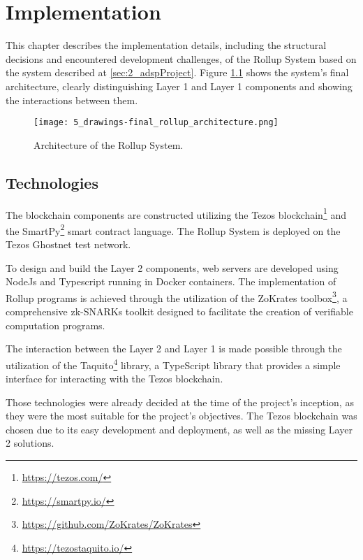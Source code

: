 \chapter{Implementation \label{cha:chapter6}}

This chapter describes the implementation details, including the structural decisions and  encountered development challenges, of the Rollup System based on the system described at \ref{sec:2_adspProject}. Figure \ref{fig:6_drawings-final_rollup_architecture} shows the system's final architecture, clearly distinguishing Layer 1 and Layer 1 components and showing the interactions between them.

\begin{figure}[ht]
	\centering
	\texttt{[image: 5\_drawings-final\_rollup\_architecture.png]}
	\caption[Rollup Architecture]{Architecture of the Rollup System.}
	\label{fig:6_drawings-final_rollup_architecture}
\end{figure}

\section{Technologies\label{sec:technologies}}

The blockchain components are constructed utilizing the Tezos blockchain\footnote{\url{https://tezos.com/}} and the SmartPy\footnote{\url{https://smartpy.io/}} smart contract language. The Rollup System is deployed on the Tezos Ghostnet test network.

To design and build the Layer 2 components, web servers are developed using NodeJs and Typescript running in Docker containers. The implementation of Rollup programs is achieved through the utilization of the ZoKrates toolbox\footnote{\url{https://github.com/ZoKrates/ZoKrates}}, a comprehensive zk-SNARKs toolkit designed to facilitate the creation of verifiable computation programs.

The interaction between the Layer 2 and Layer 1 is made possible through the utilization of the Taquito\footnote{\url{https://tezostaquito.io/}} library, a TypeScript library that provides a simple interface for interacting with the Tezos blockchain.

Those technologies were already decided at the time of the project's inception, as they were the most suitable for the project's objectives. The Tezos blockchain was chosen due to its easy development and deployment, as well as the missing Layer 2 solutions.

